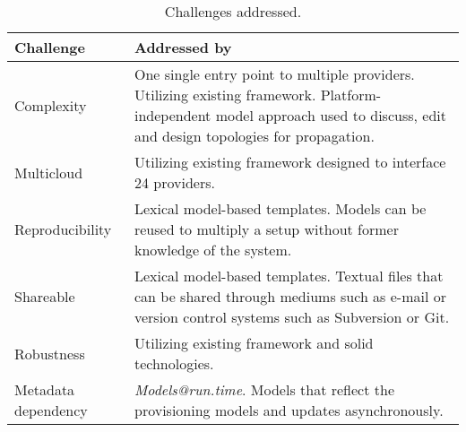 \begin{table}
  \begin{tabular}{ | l | p{9cm} | }
    \hline
    \textbf{Challenge} & \textbf{Addressed by} \\ \hline
    Complexity & One single entry point to multiple providers.
      Utilizing existing framework.
      Platform-independent model approach
      used to discuss, edit and design topologies for propagation.
      \\ \hline
    Multicloud &  Utilizing existing framework designed to interface 24 providers. \\ \hline
    Reproducibility & Lexical model-based templates.
      Models can be reused to multiply a setup without former knowledge of the system. \\ \hline
    Shareable & Lexical model-based templates.
      Textual files that can be shared through mediums such as e-mail or version control systems
      such as Subversion or Git. \\ \hline
    Robustness & Utilizing existing framework and solid technologies. \\ \hline
    Metadata dependency & \emph{Models@run.time}.
      Models that reflect the provisioning models and updates asynchronously. \\ 
    \hline
  \end{tabular}
  \caption{Challenges addressed.}
  \label{table:challenges}
\end{table}
